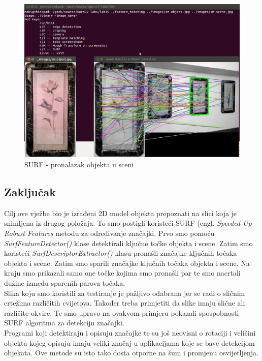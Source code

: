 \begin{figure}[h]
\centering
\includegraphics[scale=0.42]{images/lab4-surf-01.png}
\caption{SURF - pronalazak objekta u sceni}
\label{fig:lab4-surf-01}
\end{figure}

\newpage
\subsection{Zaključak}
Cilj ove vježbe bio je izrađeni 2D model objekta prepoznati na 
slici koja je snimljena iz drugog položaja.
To smo postigli koristeći SURF (engl. \textit{Speeded Up Robust
Features} metodu za određivanje značajki. Prvo smo pomoću
\textit{SurfFeatureDetector()} klase detektirali ključne točke
objekta i scene. Zatim smo koristeći \textit{SurfDescriptorExtractor()}
klasu pronašli značajke ključnih točaka objekta i scene. Zatim smo
sparili značajke ključnih točaka objekta i scene. Na kraju smo prikazali
samo one točke kojima smo pronašli par te smo nacrtali dužine između
sparenih parova točaka.
\\
Slika koju smo koristili za testiranje je pažljivo odabrana jer se radi
o sličnim crtežima različitih cvijetova. Također treba primjetiti
da slike imaju slične ali različite okvire. Te smo upravo na ovakvom
primjeru pokazali spospobnosti SURF algoritma za detekciju značajki.
\\
Programi koji detektiraju i opisuju značajke te su još neovisni o
rotaciji i veličini objekta kojeg opisuju imaju veliki značaj u
aplikacijama koje se bave detekcijom objekata. Ove metode su isto tako
dosta otporne na šum i promjenu osvijetljenja. 


